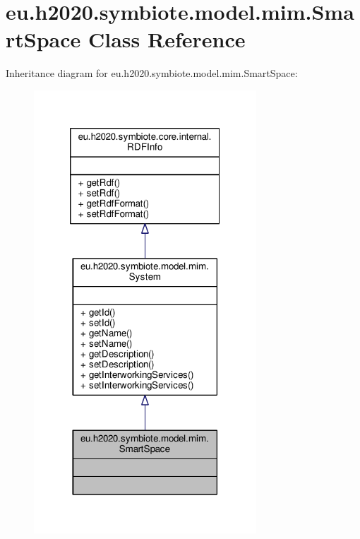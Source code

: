 \hypertarget{classeu_1_1h2020_1_1symbiote_1_1model_1_1mim_1_1SmartSpace}{}\section{eu.\+h2020.\+symbiote.\+model.\+mim.\+Smart\+Space Class Reference}
\label{classeu_1_1h2020_1_1symbiote_1_1model_1_1mim_1_1SmartSpace}


Inheritance diagram for eu.\+h2020.\+symbiote.\+model.\+mim.\+Smart\+Space\+:\nopagebreak
\begin{figure}[H]
\begin{center}
\leavevmode
\includegraphics[width=236pt]{classeu_1_1h2020_1_1symbiote_1_1model_1_1mim_1_1SmartSpace__inherit__graph}
\end{center}
\end{figure}


